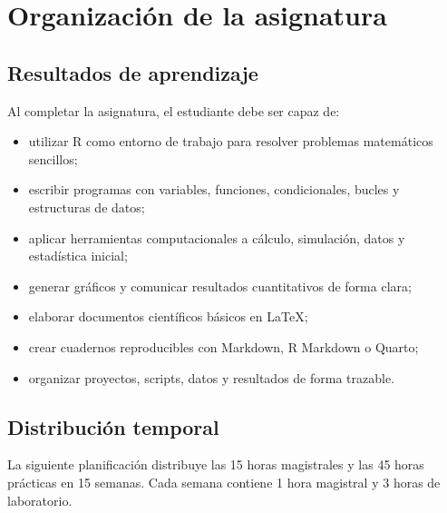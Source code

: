 \documentclass[11pt,a4paper,oneside]{book}
\begin{document}
\tableofcontents

\mainmatter

\chapter{Organización de la asignatura}

\section{Resultados de aprendizaje}
Al completar la asignatura, el estudiante debe ser capaz de:
\begin{itemize}
  \item utilizar R como entorno de trabajo para resolver problemas matemáticos sencillos;
  \item escribir programas con variables, funciones, condicionales, bucles y estructuras de datos;
  \item aplicar herramientas computacionales a cálculo, simulación, datos y estadística inicial;
  \item generar gráficos y comunicar resultados cuantitativos de forma clara;
  \item elaborar documentos científicos básicos en LaTeX;
  \item crear cuadernos reproducibles con Markdown, R Markdown o Quarto;
  \item organizar proyectos, scripts, datos y resultados de forma trazable.
\end{itemize}

\section{Distribución temporal}
La siguiente planificación distribuye las 15 horas magistrales y las 45 horas prácticas en 15 semanas. Cada semana contiene 1 hora magistral y 3 horas de laboratorio.
\end{document}
